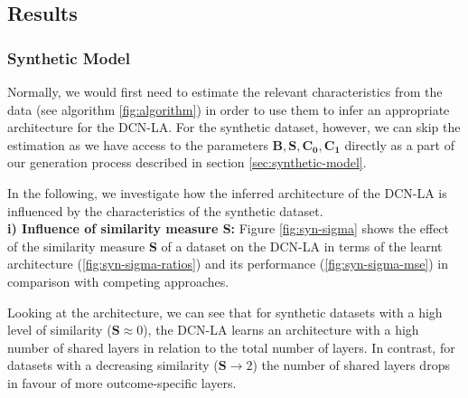 \subsection{Results}

\subsubsection{Synthetic Model}
Normally, we would first need to estimate the relevant characteristics from the data (see algorithm \ref{fig:algorithm}) in order to use them to infer an appropriate architecture for the DCN-LA. For the synthetic dataset, however, we can skip the estimation as we have access to the parameters $\mathbf{B}, \mathbf{S}, \mathbf{C_0}, \mathbf{C_1}$ directly as a part of our generation process described in  section \ref{sec:synthetic-model}. 

In the following, we investigate how the inferred architecture of the DCN-LA is influenced by the characteristics of the synthetic dataset.  \\

\textbf{i) Influence of similarity measure S:} 
Figure \ref{fig:syn-sigma} shows the effect of the similarity measure \textbf{S} of a dataset on the DCN-LA in terms of the learnt architecture (\ref{fig:syn-sigma-ratios}) and its performance (\ref{fig:syn-sigma-mse}) in comparison with competing approaches. 

Looking at the architecture, we can see that for synthetic datasets with a high level of similarity ($\mathbf{S} \approx 0$), the DCN-LA learns an architecture with a high number of shared layers in relation to the total number of layers. In contrast, for datasets with a decreasing similarity ($\mathbf{S} \rightarrow 2$) %
the number of shared layers drops in favour of more outcome-specific layers. 

